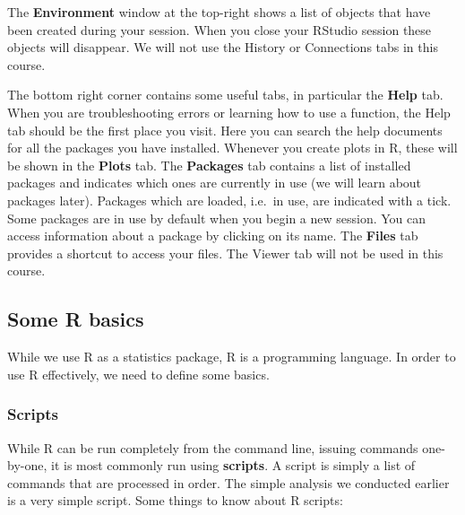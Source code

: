 \documentclass[
  a4paper,
]{memoir}
\begin{document}
The \textbf{Environment} window at the top-right shows a list of objects
that have been created during your session. When you close your RStudio
session these objects will disappear. We will not use the History or
Connections tabs in this course.

The bottom right corner contains some useful tabs, in particular the
\textbf{Help} tab. When you are troubleshooting errors or learning how
to use a function, the Help tab should be the first place you visit.
Here you can search the help documents for all the packages you have
installed. Whenever you create plots in R, these will be shown in the
\textbf{Plots} tab. The \textbf{Packages} tab contains a list of
installed packages and indicates which ones are currently in use (we
will learn about packages later). Packages which are loaded, i.e.~in
use, are indicated with a tick. Some packages are in use by default when
you begin a new session. You can access information about a package by
clicking on its name. The \textbf{Files} tab provides a shortcut to
access your files. The Viewer tab will not be used in this course.

\subsection{Some R basics}\label{some-r-basics}

While we use R as a statistics package, R is a programming language. In
order to use R effectively, we need to define some basics.

\subsubsection{Scripts}\label{scripts}

While R can be run completely from the command line, issuing commands
one-by-one, it is most commonly run using \textbf{scripts}. A script is
simply a list of commands that are processed in order. The simple
analysis we conducted earlier is a very simple script. Some things to
know about R scripts:
\end{document}
